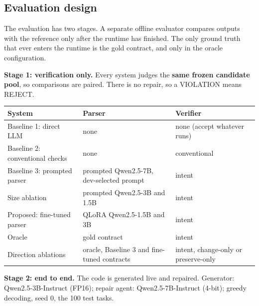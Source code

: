 \documentclass[11pt]{article}
\begin{document}
\subsection{Evaluation design}

The evaluation has two stages. A separate offline evaluator compares
outputs with the reference only after the runtime has finished. The only
ground truth that ever enters the runtime is the gold contract, and only
in the oracle configuration.

\textbf{Stage 1: verification only.} Every system judges the
\textbf{same frozen candidate pool}, so comparisons are paired. There is
no repair, so a VIOLATION means REJECT.

\begin{table}[!tp]
\centering\footnotesize\setlength{\tabcolsep}{3pt}\renewcommand{\arraystretch}{1.1}
\begin{tabularx}{\textwidth}{>{\raggedright\arraybackslash}X>{\raggedright\arraybackslash}X>{\raggedright\arraybackslash}X}
\toprule
\textbf{System} & \textbf{Parser} & \textbf{Verifier} \\
\midrule
Baseline 1: direct LLM & none & none (accept whatever runs) \\
Baseline 2: conventional checks & none & conventional \\
Baseline 3: prompted parser & prompted Qwen2.5-7B, dev-selected prompt & intent \\
Size ablation & prompted Qwen2.5-3B and 1.5B & intent \\
Proposed: fine-tuned parser & QLoRA Qwen2.5-1.5B and 3B & intent \\
Oracle & gold contract & intent \\
Direction ablations & oracle, Baseline 3 and fine-tuned contracts & intent, change-only or preserve-only \\
\bottomrule
\end{tabularx}
\end{table}

\textbf{Stage 2: end to end.} The code is generated live and repaired.
Generator: Qwen2.5-3B-Instruct (FP16); repair agent: Qwen2.5-7B-Instruct
(4-bit); greedy decoding, seed 0, the 100 test tasks.
\end{document}
